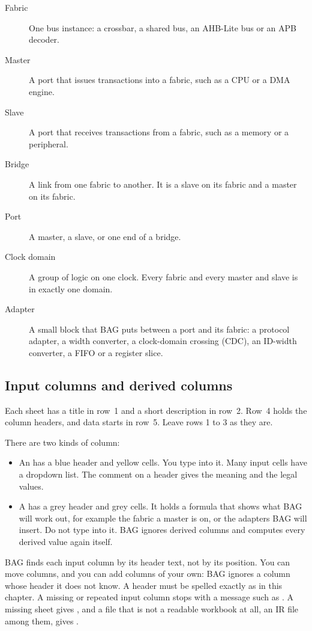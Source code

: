 \begin{description}
\item[Fabric] One bus instance: a crossbar, a shared bus, an AHB-Lite bus or an APB
  decoder.
\item[Master] A port that issues transactions into a fabric, such as a CPU or a DMA
  engine.
\item[Slave] A port that receives transactions from a fabric, such as a memory or a
  peripheral.
\item[Bridge] A link from one fabric to another. It is a slave on its
   fabric and a master on its  fabric.
\item[Port] A master, a slave, or one end of a bridge.
\item[Clock domain] A group of logic on one clock. Every fabric and every master and
  slave is in exactly one domain.
\item[Adapter] A small block that BAG puts between a port and its fabric: a protocol
  adapter, a width converter, a clock-domain crossing (CDC), an ID-width converter, a
  FIFO or a register slice.
\end{description}

\subsection{Input columns and derived columns}

Each sheet has a title in row~1 and a short description in row~2. Row~4 holds the
column headers, and data starts in row~5. Leave rows 1 to 3 as they are.

There are two kinds of column:

\begin{itemize}
\item An  has a blue header and yellow cells. You type into it. Many
  input cells have a dropdown list. The comment on a header gives the meaning and the
  legal values.
\item A  has a grey header and grey cells. It holds a formula that
  shows what BAG will work out, for example the fabric a master is on, or the adapters
  BAG will insert. Do not type into it. BAG ignores derived columns and computes every
  derived value again itself.
\end{itemize}

BAG finds each input column by its header text, not by its position. You can move
columns, and you can add columns of your own: BAG ignores a column whose header it does
not know. A header must be spelled exactly as in this chapter. A missing or repeated
input column stops  with a message such as
. A missing sheet
gives , and a file that is not a readable  workbook at all,
an IR file among them, gives .


